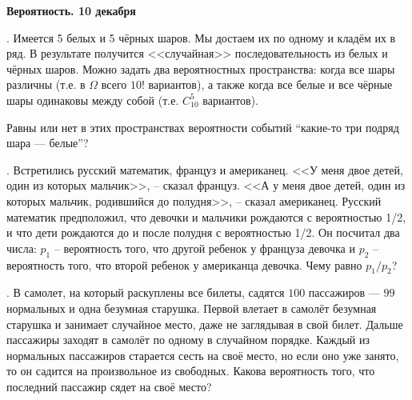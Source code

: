 \centerline{\bf Вероятность. 10 декабря}

. Имеется 5 белых и 5 чёрных шаров. Мы достаем их по одному и кладём их в ряд. В результате 
получится <<случайная>> последовательность из белых и чёрных шаров. Можно задать два вероятностных пространства:
когда все шары различны (т.е. в $\Omega$ всего $10!$ вариантов), а также когда все белые и все чёрные шары одинаковы между собой 
(т.е. $C_{10}^5$ вариантов).

Равны или нет в этих пространствах вероятности событий ``какие-то три подряд шара --- белые''?

. Встретились русский математик, француз и американец. <<У меня двое детей, один из которых мальчик>>, -- 
сказал француз. <<А у меня двое детей, один из которых мальчик, родившийся до полудня>>, -- сказал американец. 
Русский математик предположил, что девочки и мальчики рождаются с вероятностью 1/2, и что 
дети рождаются до и после полудня с вероятностью 1/2. Он посчитал два числа: $p_1$ -- вероятность того, 
что другой ребенок у француза девочка и $p_2$ -- вероятность того, что второй ребенок у американца девочка.
Чему равно $p_1/p_2$? 


.  В самолет, на который раскуплены все билеты, садятся $100$ 
пассажиров --- $99$ нормальных и одна безумная старушка. Первой влетает в самолёт безумная старушка
и занимает случайное место, даже не заглядывая в свой билет. Дальше пассажиры заходят в 
самолёт по одному в случайном порядке. Каждый из 
нормальных пассажиров старается сесть на своё место, но если оно уже занято, 
то он садится на произвольное из свободных. Какова вероятность того, что последний пассажир сядет на своё место?






